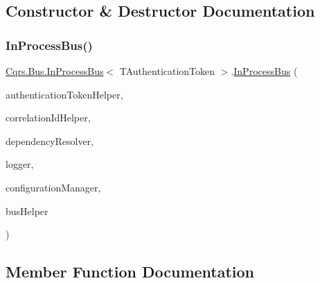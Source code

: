 \subsection{Constructor \& Destructor Documentation}
\mbox{\label{classCqrs_1_1Bus_1_1InProcessBus_a64bea583461562783d97cd98ff0dff91_a64bea583461562783d97cd98ff0dff91}} 
\subsubsection{\texorpdfstring{In\+Process\+Bus()}{InProcessBus()}}
{\footnotesize\ttfamily \hyperlink{classCqrs_1_1Bus_1_1InProcessBus}{Cqrs.\+Bus.\+In\+Process\+Bus}$<$ T\+Authentication\+Token $>$.\hyperlink{classCqrs_1_1Bus_1_1InProcessBus}{In\+Process\+Bus} (\begin{DoxyParamCaption}\item[{\hyperlink{interfaceCqrs_1_1Authentication_1_1IAuthenticationTokenHelper}{I\+Authentication\+Token\+Helper}$<$ T\+Authentication\+Token $>$}]{authentication\+Token\+Helper,  }\item[{I\+Correlation\+Id\+Helper}]{correlation\+Id\+Helper,  }\item[{\hyperlink{interfaceCqrs_1_1Configuration_1_1IDependencyResolver}{I\+Dependency\+Resolver}}]{dependency\+Resolver,  }\item[{I\+Logger}]{logger,  }\item[{\hyperlink{interfaceCqrs_1_1Configuration_1_1IConfigurationManager}{I\+Configuration\+Manager}}]{configuration\+Manager,  }\item[{\hyperlink{interfaceCqrs_1_1Bus_1_1IBusHelper}{I\+Bus\+Helper}}]{bus\+Helper }\end{DoxyParamCaption})}



\subsection{Member Function Documentation}
\mbox{\label{classCqrs_1_1Bus_1_1InProcessBus_a603950d39c407d5b9661dc0937fa67cc_a603950d39c407d5b9661dc0937fa67cc}} 
